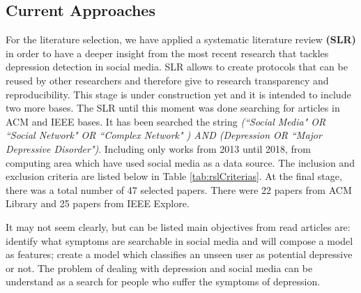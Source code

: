 \documentclass[11pt, notitlepage]{article} %
\begin{document}
\subsection{Current Approaches}\label{subsec:srl}
For the literature selection, we have applied a systematic literature review \textbf{(SLR)} in order to have a deeper insight from the most recent research that tackles depression detection in social media. 
SLR allows to create protocols that can be reused by other researchers and therefore give to research transparency and reproducibility.
This stage is under construction yet and it is intended to include two more bases. The SLR until this moment was done searching for articles in ACM and IEEE bases. It has been searched the string \textit{(``Social Media" OR ``Social Network" OR ``Complex Network" ) AND (Depression OR ``Major Depressive Disorder")}. Including only works from 2013 until 2018, from computing area which have used social media as a data source. The inclusion and exclusion criteria are listed below in Table \ref{tab:rslCriterias}. At the final stage, there was a total number of 47 selected papers. There were 22 papers from ACM Library and 25 papers from IEEE Explore.

\begin{center}
  \begin{table}[h!]
  \centering
    \caption{SLR Criterias for inclusion and exclusion.}
    \label{tab:rslCriterias}
  \end{table}
\end{center}
It may not seem clearly, but can be listed main objectives from read articles are: identify what symptoms are searchable in social media and will compose a model as features; create a model which classifies an unseen user as potential depressive or not. The problem of dealing with depression and social media can be understand as a search for people who suffer the symptoms of depression.
%
\end{document}

